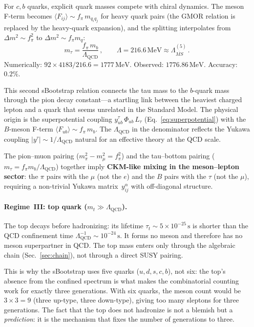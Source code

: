 \documentclass[aps,prd,twocolumn,showpacs,preprintnumbers,superscriptaddress]{revtex4-2}
\newcommand{\MeV}{\,\mathrm{MeV}}
\newcommand{\Lqcd}{\Lambda_{\mathrm{QCD}}}
\begin{document}
For $c, b$ quarks, explicit quark masses compete with chiral
dynamics.  The meson F-term becomes
$\langle F_{ij}\rangle \sim f_\pi\,m_{q_i q_j}$
for heavy quark pairs (the GMOR relation is replaced by
the heavy-quark expansion), and the splitting interpolates
from $\Delta m^2 \sim f_\pi^2$ to $\Delta m^2 \sim f_\pi m_q$:
\begin{equation}
  m_\tau = \frac{f_\pi\,m_b}{\Lqcd}\,,\qquad
  \Lambda = 216.6\MeV \approx \Lambda_{\overline{MS}}^{(5)}\,.
  \label{eq:regime2}
\end{equation}
Numerically: $92 \times 4183 / 216.6 = 1777\MeV$.
Observed: $1776.86\MeV$.  Accuracy: $0.2\%$.

This second sBootstrap relation connects the tau mass to the
$b$-quark mass through the pion decay constant---a
startling link between the heaviest charged lepton and a
quark that seems unrelated in the Standard Model.
The physical origin is the superpotential coupling
$y^\tau_{ub}\,\Phi_{ub}\,L_\tau$
(Eq.~\ref{eq:superpotential}) with the
$B$-meson F-term $\langle F_{ub}\rangle \sim f_\pi\,m_b$.
The $\Lqcd$ in the denominator reflects the Yukawa coupling
$|y^\tau| \sim 1/\Lqcd$ natural for an effective theory
at the QCD scale.

The pion--muon pairing ($m_\pi^2 - m_\mu^2 = f_\pi^2$) and
the tau--bottom pairing ($m_\tau = f_\pi m_b/\Lqcd$) together
imply \textbf{CKM-like mixing in the meson--lepton sector}:
the $\pi$ pairs with the $\mu$ (not the $e$) and the $B$
pairs with the $\tau$ (not the $\mu$), requiring a non-trivial
Yukawa matrix~$y^\alpha_{ij}$ with off-diagonal structure.

\paragraph{Regime~III: top quark ($m_t \gg \Lqcd$).}

The top decays before hadronizing: its lifetime
$\tau_t \sim 5 \times 10^{-25}\,\text{s}$ is shorter than
the QCD confinement time
$\Lambda_{\mathrm{QCD}}^{-1} \sim 10^{-24}\,\text{s}$.
It forms no meson and therefore has no meson superpartner
in QCD.
The top mass enters only through the algebraic chain
(Sec.~\ref{sec:chain}), not through a direct SUSY pairing.

This is why the sBootstrap uses five quarks ($u,d,s,c,b$),
not six: the top's absence from the confined spectrum is
what makes the combinatorial counting work for exactly three
generations.
With six quarks, the meson count would be $3 \times 3 = 9$
(three up-type, three down-type), giving too many sleptons
for three generations.
The fact that the top does not hadronize is not a blemish
but a \emph{prediction}: it is the mechanism that fixes
the number of generations to three.
\end{document}
